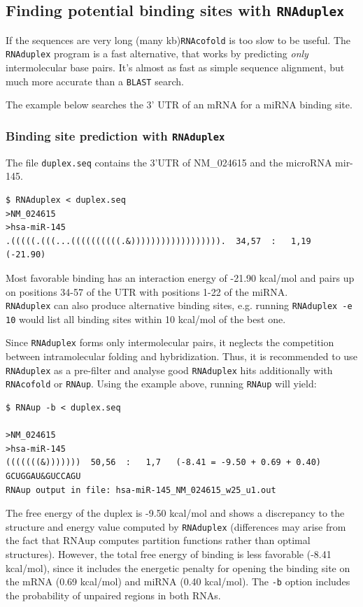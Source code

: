 \documentclass[a4paper]{article}
\newcommand{\frametitle}[1]{\subsubsection{#1}}
\begin{document}
\pagebreak[2]
\subsection{Finding potential binding sites with \tt RNAduplex}

If the sequences are very long (many kb)\texttt{RNAcofold} is too slow to be useful.
The \texttt{RNAduplex} program is a fast alternative, that works by
predicting \emph{only} intermolecular base pairs. It's almost as fast
as simple sequence alignment, but much more accurate than a \texttt{BLAST}
search.

The example below searches the 3' UTR of an mRNA for a miRNA binding site.

  \frametitle{Binding site prediction with \tt RNAduplex}
  The file \texttt{duplex.seq} contains the 3'UTR of NM\_024615 and the
  microRNA mir-145.
  \begin{small}
\begin{verbatim}
$ RNAduplex < duplex.seq
>NM_024615
>hsa-miR-145
.(((((.(((...((((((((((.&)))))))))))))))))).  34,57  :   1,19  (-21.90)
\end{verbatim}%
  \end{small}
  Most favorable binding has an interaction energy of -21.90 kcal/mol and pairs up on positions
  34-57 of the UTR with positions 1-22 of the miRNA.\\

\texttt{RNAduplex} can also produce alternative binding sites, e.g. running
\texttt{RNAduplex -e 10} would list all binding sites within 10 kcal/mol of
the best one.

Since \texttt{RNAduplex} forms only intermolecular pairs, it neglects the
competition between intramolecular folding and hybridization. Thus, it is
recommended to use \texttt{RNAduplex} as a pre-filter and analyse good
\texttt{RNAduplex} hits additionally with \texttt{RNAcofold} or
\texttt{RNAup}. Using the example above, running \texttt{RNAup} will yield:

  \begin{small}
\begin{verbatim}
$ RNAup -b < duplex.seq

>NM_024615
>hsa-miR-145
(((((((&)))))))  50,56  :   1,7   (-8.41 = -9.50 + 0.69 + 0.40)
GCUGGAU&GUCCAGU
RNAup output in file: hsa-miR-145_NM_024615_w25_u1.out
\end{verbatim}%
  \end{small}
  The free energy of the duplex is -9.50 kcal/mol and shows a discrepancy to the
  structure and energy value computed by \texttt{RNAduplex} (differences may arise from
  the fact that RNAup computes partition functions rather than optimal structures).
  However, the total free energy of binding is less favorable (-8.41 kcal/mol), since it
  includes the energetic penalty for opening the binding site on the mRNA
  (0.69 kcal/mol) and miRNA (0.40 kcal/mol). The \texttt{-b} option includes the
  probability of unpaired regions in both RNAs. 
\end{document}
